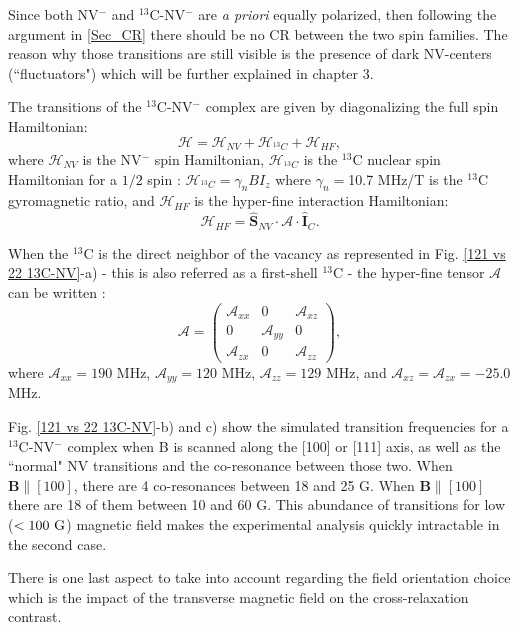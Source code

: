 \documentclass[a4paper, 11pt]{book}
\begin{document}
Since both NV$^-$ and $^{13}$C-NV$^-$ are \textit{a priori} equally polarized, then following the argument in \ref{Sec_CR} there should be no CR between the two spin families. The reason why those transitions are still visible is the presence of dark NV-centers (``fluctuators") which will be further explained in chapter 3.

The transitions of the $^{13}$C-NV$^-$ complex are given by diagonalizing the full spin Hamiltonian:
\begin{equation*}
\mathcal{H}=\mathcal{H}_{NV}+\mathcal{H}_{^{13}C}+\mathcal{H}_{HF},
\end{equation*}
where $\mathcal{H}_{NV}$ is the NV$^-$ spin Hamiltonian,
$\mathcal{H}_{^{13}C}$ is the $^{13}$C nuclear spin Hamiltonian for a $1/2$ spin : $\mathcal{H}_{^{13}C}=\gamma_{n} B I_z$ where $\gamma_{n}=$10.7 MHz/T is the $^{13}$C gyromagnetic ratio, and $\mathcal{H}_{HF}$ is the hyper-fine interaction Hamiltonian: $$\mathcal{H}_{HF}= \hat{\mathbf{S}}_{NV} \cdot \mathcal{A} \cdot \hat{\mathbf{I}}_C.$$

When the $^{13}$C is the direct neighbor of the vacancy as represented in Fig. \ref{121 vs 22 13C-NV}-a) - this is also referred as a first-shell $^{13}$C - the hyper-fine tensor $\mathcal{A}$ can be written \citep{simanovskaia2013sidebands}:
$$ \mathcal{A} = \begin{pmatrix}
\mathcal{A}_{xx} & 0 & \mathcal{A}_{xz} \\ 0 & \mathcal{A}_{yy} & 0 \\ \mathcal{A}_{zx} & 0 & \mathcal{A}_{zz}
\end{pmatrix},$$
where $\mathcal{A}_{xx}=190$ MHz, $\mathcal{A}_{yy}=120$ MHz, $\mathcal{A}_{zz}=129$ MHz, and  $\mathcal{A}_{xz}=\mathcal{A}_{zx}=-25.0$ MHz. 

Fig. \ref{121 vs 22 13C-NV}-b) and c) show the simulated transition frequencies for a $^{13}$C-NV$^-$ complex when B is scanned along the [100] or [111] axis, as well as the ``normal" NV transitions and the co-resonance between those two. When $\mathbf{B} \parallel [100]$, there are 4 co-resonances between 18 and 25 G. When $\mathbf{B} \parallel [100]$ there are 18 of them between 10 and 60 G. This abundance of transitions for low ($<100\ \rm G$) magnetic field makes the experimental analysis quickly intractable in the second case.

There is one last aspect to take into account regarding the field orientation choice which is the impact of the transverse magnetic field on the cross-relaxation contrast.
\end{document}

